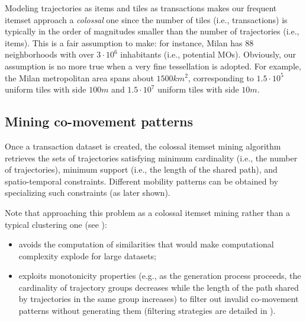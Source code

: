 \documentclass[
]{ceurart}
\begin{document}
Modeling trajectories as items and tiles as transactions makes our frequent itemset approach a \textit{colossal} one since the number of tiles (i.e., transactions) is typically in the order of magnitudes smaller than the number of trajectories (i.e., items). 
This is a fair assumption to make: for instance, Milan has 88 neighborhoods with over $3 \cdot 10^6$ inhabitants (i.e., potential MOs). 
Obviously, our assumption is no more true when a very fine tessellation is adopted.
For example, the Milan metropolitan area spans about $1500km^2$, corresponding to $1.5\cdot10^5$ uniform tiles with side $100m$ and $1.5\cdot10^7$ uniform tiles with side $10m$.

\subsection{Mining co-movement patterns}
Once a transaction dataset is created, the colossal itemset mining algorithm retrieves the sets of trajectories satisfying minimum cardinality (i.e., the number of trajectories), minimum support (i.e., the length of the shared path), and spatio-temporal constraints.
Different mobility patterns can be obtained by specializing such constraints (as later shown).

Note that approaching this problem as a colossal itemset mining rather than a typical clustering one (see ):
\begin{itemize}
    \item avoids the computation of similarities that would make computational complexity explode for large datasets;
    \item exploits monotonicity properties (e.g., as the generation process proceeds, the cardinality of trajectory groups decreases while the length of the path shared by trajectories in the same group increases) to filter out invalid co-movement patterns without generating them (filtering strategies are detailed in ).
\end{itemize}
\end{document}
